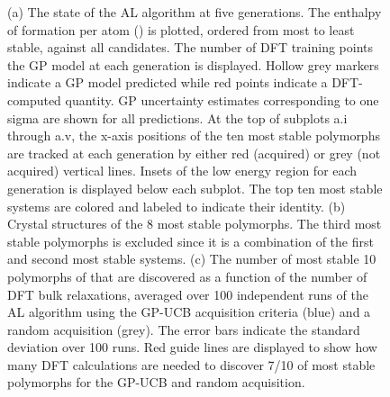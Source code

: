 \begin{figure}[!htb]
\centering
{}
\caption{\label{fig:iro3_al}
%
(a) The state of the AL algorithm at five generations.
%
The enthalpy of formation per atom (\DHf) is plotted, ordered from most to least stable, against all \IrOthree candidates.
%
The number of DFT training points the GP model at each generation is displayed.
%
Hollow grey markers indicate a GP model predicted \DHf while red points indicate a DFT-computed quantity.
%
GP uncertainty estimates corresponding to one sigma are shown for all predictions.
%
At the top of subplots a.i through a.v, the x-axis positions of the ten most stable polymorphs are tracked at each generation by either red (acquired) or grey (not acquired) vertical lines.
%
Insets of the low energy region for each generation is displayed below each subplot.
%
The top ten most stable systems are colored and labeled to indicate their identity.
%
(b) Crystal structures of the \num{8} most stable \IrOthree polymorphs.
%
The third most stable polymorphs is excluded since it is a combination of the first and second most stable systems.
%
(c) The number of most stable \num{10} polymorphs of \IrOthree that are discovered as a function of the number of DFT bulk relaxations,
averaged over \num{100} independent runs of the AL algorithm using the GP-UCB acquisition criteria (blue) and a random acquisition (grey).
%
The error bars indicate the standard deviation over \num{100} runs.
%
Red guide lines are displayed to show how many DFT calculations are needed to discover \num{7/10} of most stable polymorphs for the GP-UCB and random acquisition.
}
\end{figure}

